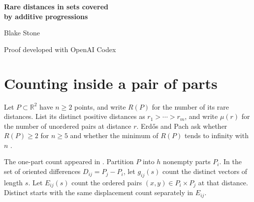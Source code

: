 \documentclass[10pt,letterpaper]{article}
\newcommand{\R}{\mathbb R}
\begin{document}
\begin{center}
{\LARGE\bfseries Rare distances in sets covered\\[2pt] by additive progressions\par}
\vspace{9pt}
{\large Blake Stone\par}\vspace{2pt}
{\small Proof developed with OpenAI Codex\par}
\end{center}
\begin{abstract}
For a planar set of $n$ points, a positive interpoint distance is rare if at most $n$ unordered pairs realize it. Suppose the set is covered by $h$ generalized arithmetic progressions with bounded rank and polynomial side lengths. We show that its largest $\lfloor (n-1)/(h^2n^{o(1)})\rfloor$ distinct distances exist and are rare. The progressions may have unrelated generators and translations. Applied to squared distances measured from three noncollinear points, the result raises an earlier progression-cover exponent from $1/10$ to $1/6$. We also obtain a restriction on which individual points can have simple squared-distance sets. The unrestricted Erd\H{o}s--Pach questions remain open.
\end{abstract}

\section{Counting inside a pair of parts}
Let $P\subset\R^2$ have $n\ge2$ points, and write $R(P)$ for the number of its rare distances. List its distinct positive distances as $r_1>\cdots>r_m$, and write $\mu(r)$ for the number of unordered pairs at distance $r$. Erd\H{o}s and Pach ask whether $R(P)\ge2$ for $n\ge5$ and whether the minimum of $R(P)$ tends to infinity with $n$ \cite{problem}.

The one-part count appeared in \cite{previous}. Partition $P$ into $h$ nonempty parts $P_i$. In the set of oriented differences $D_{ij}=P_j-P_i$, let $g_{ij}(s)$ count the distinct vectors of length $s$. Let $E_{ij}(s)$ count the ordered pairs $(x,y)\in P_i\times P_j$ at that distance. Distinct starts with the same displacement count separately in $E_{ij}$.
\end{document}
